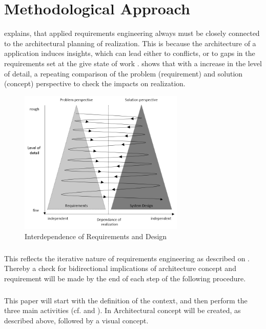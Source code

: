 \chapter{Methodological Approach}
\textcite[22-23]{Pohl.2007} explains, that applied requirements engineering always must be closely connected to the architectural planning of realization. This is because the architecture of a application induces insights, which can lead either to conflicts, or to gaps in the requirements set at the give state of work \parencites[22-23]{Pohl.2007}.  shows that with a increase in the level of detail, a repeating comparison of the problem (requirement) and solution (concept) perspective to check the impacts on realization.

\begin{figure}[H]
    \centering
    \includegraphics[width=0.7\textwidth]{img/iterative.png}
    \caption[Interdependence of Requirements and Design]{Interdependence of Requirements and Design \parencite[23]{Pohl.2007}}
    \label{fig:iterative}
\end{figure}

\paragraph{} This reflects the iterative nature of requirements engineering as described on . Thereby a check for bidirectional implications of architecture concept and requirement will be made by the end of each step of the following procedure.

\paragraph{} This paper will start with the definition of the context, and then perform the three main activities (cf.  and ). In Architectural concept will be created, as described above, followed by a visual concept. 


